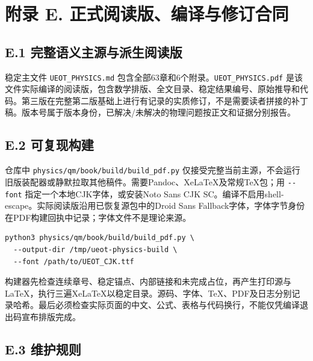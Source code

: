 \documentclass[
  11pt,
  oneside]{book}
\begin{document}
\hypertarget{appendix-e}{%
\chapter{附录 E. 正式阅读版、编译与修订合同}\label{appendix-e}}

\hypertarget{e.1-ux5b8cux6574ux8bedux4e49ux4e3bux6e90ux4e0eux6d3eux751fux9605ux8bfbux7248}{%
\section{E.1
完整语义主源与派生阅读版}\label{e.1-ux5b8cux6574ux8bedux4e49ux4e3bux6e90ux4e0eux6d3eux751fux9605ux8bfbux7248}}

稳定主文件 \texttt{UEOT\_\allowbreak PHYSICS.md}
包含全部63章和6个附录。\texttt{UEOT\_\allowbreak PHYSICS.pdf}
是该文件实际编译的阅读版，包含数学排版、全文目录、稳定结果编号、原始推导和代码。第三版在完整第二版基础上进行有记录的实质修订，不是需要读者拼接的补丁稿。版本号属于版本身份，已解决/未解决的物理问题按正文和证据分别报告。

\hypertarget{e.2-ux53efux590dux73b0ux6784ux5efa}{%
\section{E.2 可复现构建}\label{e.2-ux53efux590dux73b0ux6784ux5efa}}

仓库中 \texttt{physics/qm/book/build/build\_\allowbreak pdf.py}
仅接受完整当前主源，不会运行旧版装配器或静默拉取其他稿件。需要Pandoc、XeLaTeX及常规TeX包；用
\texttt{-\/-font} 指定一个本地CJK字体，或安装Noto Sans CJK
SC。编译不启用shell-escape。实际阅读版沿用已恢复源包中的Droid Sans
Fallback字体，字体字节身份在PDF构建回执中记录；字体文件不是理论来源。

\begin{Verbatim}[breaklines,breakanywhere,fontsize=\scriptsize]
python3 physics/qm/book/build/build_pdf.py \
  --output-dir /tmp/ueot-physics-build \
  --font /path/to/UEOT_CJK.ttf
\end{Verbatim}

构建器先检查连续章号、稳定锚点、内部链接和未完成占位，再产生打印源与LaTeX，执行三遍XeLaTeX以稳定目录。源码、字体、TeX、PDF及日志分别记录哈希。最后必须检查实际页面的中文、公式、表格与代码换行，不能仅凭编译退出码宣布排版完成。

\hypertarget{e.3-ux7ef4ux62a4ux89c4ux5219}{%
\section{E.3 维护规则}\label{e.3-ux7ef4ux62a4ux89c4ux5219}}
\end{document}
